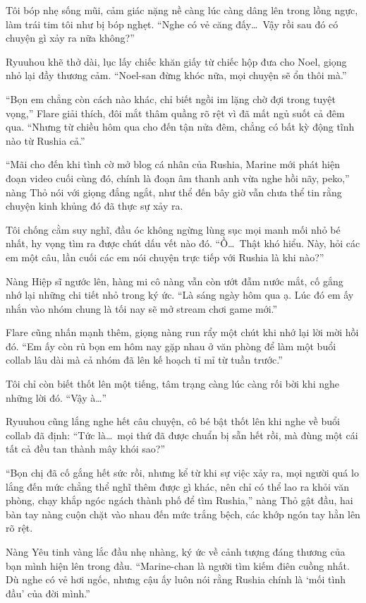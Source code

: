\documentclass[../main.tex]{subfiles}
\begin{document}
Tôi bóp nhẹ sống mũi, cảm giác nặng nề càng lúc càng dâng lên trong lồng ngực, làm trái tim tôi như bị bóp nghẹt. ``Nghe có vẻ căng đấy\dots\ Vậy rồi sau đó có chuyện gì xảy ra nữa không?''

Ryuuhou khẽ thở dài, lục lấy chiếc khăn giấy từ chiếc hộp đưa cho Noel, giọng nhỏ lại đầy thương cảm. ``Noel-san đừng khóc nữa, mọi chuyện sẽ ổn thôi mà.''

``Bọn em chẳng còn cách nào khác, chỉ biết ngồi im lặng chờ đợi trong tuyệt vọng,'' Flare giải thích, đôi mắt thâm quầng rõ rệt vì đã mất ngủ suốt cả đêm qua. ``Nhưng từ chiều hôm qua cho đến tận nửa đêm, chẳng có bất kỳ động tĩnh nào từ Rushia cả.''

``Mãi cho đến khi tình cờ mở blog cá nhân của Rushia, Marine mới phát hiện đoạn video cuối cùng đó, chính là đoạn âm thanh anh vừa nghe hồi nãy, peko,'' nàng Thỏ nói với giọng đắng ngắt, như thể đến bây giờ vẫn chưa thể tin rằng chuyện kinh khủng đó đã thực sự xảy ra.

Tôi chống cằm suy nghĩ, đầu óc không ngừng lùng sục mọi manh mối nhỏ bé nhất, hy vọng tìm ra được chút dấu vết nào đó. ``Ồ\dots\ Thật khó hiểu. Này, hỏi các em một câu, lần cuối các em nói chuyện trực tiếp với Rushia là khi nào?''

Nàng Hiệp sĩ ngước lên, hàng mi cô nàng vẫn còn ướt đẫm nước mắt, cố gắng nhớ lại những chi tiết nhỏ trong ký ức. ``Là sáng ngày hôm qua ạ. Lúc đó em ấy nhắn vào nhóm chung là tối nay sẽ mở stream chơi game mới.''

Flare cũng nhấn mạnh thêm, giọng nàng run rẩy một chút khi nhớ lại lời mời hồi đó. ``Em ấy còn rủ bọn em hôm nay gặp nhau ở văn phòng để làm một buổi collab lâu dài mà cả nhóm đã lên kế hoạch tỉ mỉ từ tuần trước.''

Tôi chỉ còn biết thốt lên một tiếng, tâm trạng càng lúc càng rối bời khi nghe những lời đó. ``Vậy à\dots''

Ryuuhou cũng lắng nghe hết câu chuyện, cô bé bật thốt lên khi nghe về buổi collab đã định: ``Tức là\dots\ mọi thứ đã được chuẩn bị sẵn hết rồi, mà đùng một cái tất cả đều tan thành mây khói sao?''

``Bọn chị đã cố gắng hết sức rồi, nhưng kể từ khi sự việc xảy ra, mọi người quá lo lắng đến mức chẳng thể nghĩ thêm được gì khác, nên chỉ có thể lao ra khỏi văn phòng, chạy khắp ngóc ngách thành phố để tìm Rushia,'' nàng Thỏ gật đầu, hai bàn tay nàng cuộn chặt vào nhau đến mức trắng bệch, các khớp ngón tay hằn lên rõ rệt.

Nàng Yêu tinh vàng lắc đầu nhẹ nhàng, ký ức về cảnh tượng đáng thương của bạn mình hiện lên trong đầu. ``Marine-chan là người tìm kiếm điên cuồng nhất. Dù nghe có vẻ hơi ngốc, nhưng cậu ấy luôn nói rằng Rushia chính là `mối tình đầu' của đời mình.''
\end{document}
